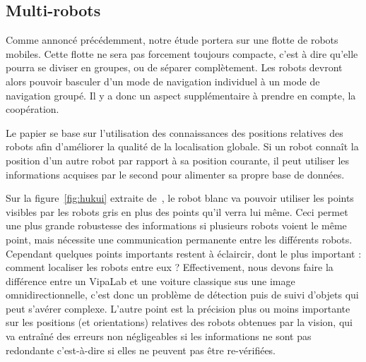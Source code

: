 \subsection{Multi-robots}

Comme annoncé précédemment, notre étude portera sur une flotte de robots mobiles.
Cette flotte ne sera pas forcement toujours compacte, c'est à dire qu'elle pourra se diviser en groupes, ou de séparer complètement.
Les robots devront alors pouvoir basculer d'un mode de navigation individuel à un mode de navigation groupé.
Il y a donc un aspect supplémentaire à prendre en compte, la coopération.

Le papier \cite{Hukui10} se base sur l'utilisation des connaissances des positions relatives des robots afin d'améliorer la qualité de la localisation globale.
Si un robot connaît la position d'un autre robot par rapport à sa position courante, il peut utiliser les informations acquises par le second pour alimenter sa propre base de données.

Sur la figure~\ref{fig:hukui} extraite de~\cite{Hukui10}, le robot blanc va pouvoir utiliser les points visibles par les robots gris en plus des points qu'il verra lui même.
Ceci permet une plus grande robustesse des informations si plusieurs robots voient le même point, mais nécessite une communication permanente entre les différents robots.
Cependant quelques points importants restent à éclaircir, dont le plus important : comment localiser les robots entre eux ?
Effectivement, nous devons faire la différence entre un VipaLab et une voiture classique sus une image omnidirectionnelle, c'est donc un problème de détection puis de suivi d'objets qui peut s'avérer complexe.
L'autre point est la précision plus ou moins importante sur les positions (et orientations) relatives des robots obtenues par la vision, qui va entraîné des erreurs non négligeables si les informations ne sont pas redondante c'est-à-dire si elles ne peuvent pas être re-vérifiées.


